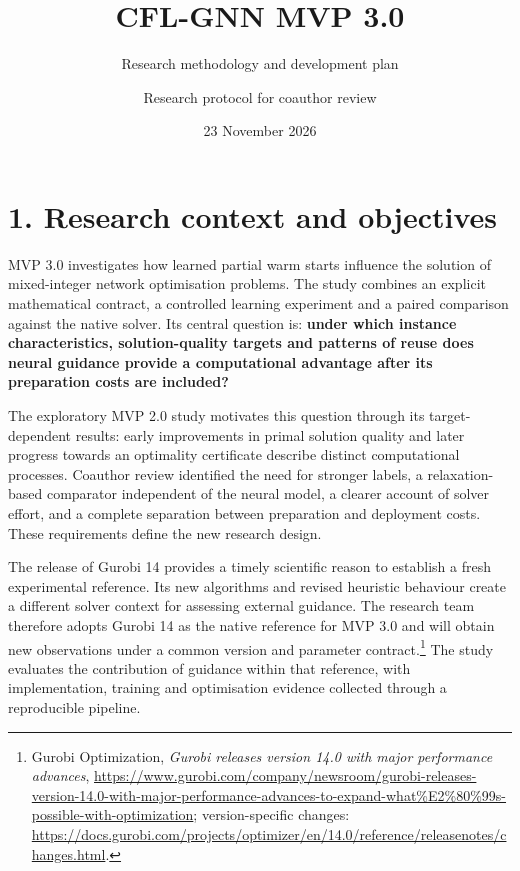 \documentclass[
  british,
  10pt,
]{article}
\title{CFL-GNN MVP 3.0}
\subtitle{Research methodology and development plan}
\author{Research protocol for coauthor review}
\date{23 November 2026}
\begin{document}
\maketitle

{
\setcounter{tocdepth}{1}
\tableofcontents
}
\clearpage

\section{1. Research context and
objectives}\label{research-context-and-objectives}

MVP 3.0 investigates how learned partial warm starts influence the
solution of mixed-integer network optimisation problems. The study
combines an explicit mathematical contract, a controlled learning
experiment and a paired comparison against the native solver. Its
central question is: \textbf{under which instance characteristics,
solution-quality targets and patterns of reuse does neural guidance
provide a computational advantage after its preparation costs are
included?}

The exploratory MVP 2.0 study motivates this question through its
target-dependent results: early improvements in primal solution quality
and later progress towards an optimality certificate describe distinct
computational processes. Coauthor review identified the need for
stronger labels, a relaxation-based comparator independent of the neural
model, a clearer account of solver effort, and a complete separation
between preparation and deployment costs. These requirements define the
new research design.

The release of Gurobi 14 provides a timely scientific reason to
establish a fresh experimental reference. Its new algorithms and revised
heuristic behaviour create a different solver context for assessing
external guidance. The research team therefore adopts Gurobi 14 as the
native reference for MVP 3.0 and will obtain new observations under a
common version and parameter contract.\footnote{Gurobi Optimization,
  \emph{Gurobi releases version 14.0 with major performance advances},
  \url{https://www.gurobi.com/company/newsroom/gurobi-releases-version-14.0-with-major-performance-advances-to-expand-what\%E2\%80\%99s-possible-with-optimization};
  version-specific changes:
  \url{https://docs.gurobi.com/projects/optimizer/en/14.0/reference/releasenotes/changes.html}.}
The study evaluates the contribution of guidance within that reference,
with implementation, training and optimisation evidence collected
through a reproducible pipeline.
\end{document}
